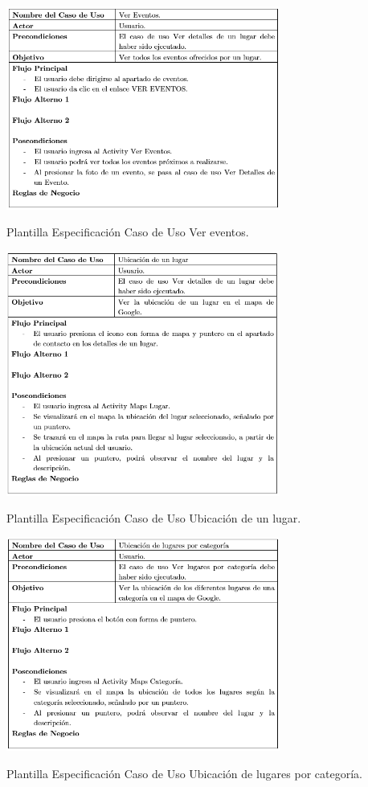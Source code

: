 \documentclass[12pt,letterpaper,openany]{book}
\begin{document}
\begin{table}[H]
\centering
\includegraphics[width=9cm]{./imagenes/PCU/ver_eventos}
\caption{Plantilla Especificación Caso de Uso Ver eventos.}
\end{table}

\begin{table}[H]
\centering
\includegraphics[width=9cm]{./imagenes/PCU/ubicacion_lugar}
\caption{Plantilla Especificación Caso de Uso Ubicación de un lugar.}
\end{table}

\begin{table}[H]
\centering
\includegraphics[width=9cm]{./imagenes/PCU/ubicacion_lugar_categoria}
\caption{Plantilla Especificación Caso de Uso Ubicación de lugares por categoría.}
\end{table}
\end{document}
